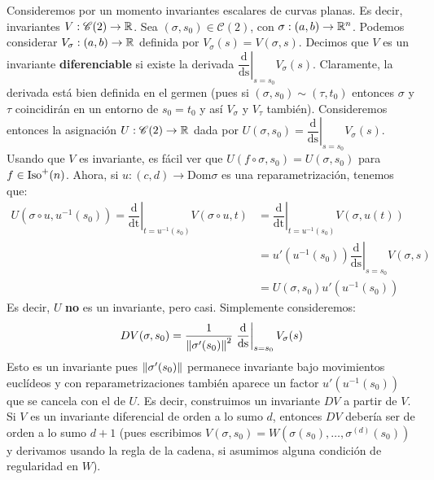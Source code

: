 Consideremos por un momento invariantes escalares de curvas planas. Es decir, invariantes $V:\mathscr{C}(2)\to\mathbb{R}$. Sea $(\sigma,s_0)\in\mathscr{C}(2)$, con $\sigma:(a,b)\to\mathbb{R}^n$. Podemos considerar $V_\sigma:(a,b)\to\mathbb{R}$ definida por $V_\sigma(s)=V(\sigma,s)$. Decimos que $V$ es un invariante \textbf{diferenciable} si existe la derivada $\left.\dfrac{\mathrm{d}}{\mathrm{ds}}\right\rvert_{s=s_0} V_\sigma(s)$. Claramente, la derivada está bien definida en el germen (pues si $(\sigma,s_0)\sim(\tau,t_0)$ entonces $\sigma$ y $\tau$ coincidirán en un entorno de $s_0=t_0$ y así $V_\sigma$ y $V_\tau$ también). Consideremos entonces la asignación $U:\mathscr{C}(2)\to\mathbb{R}$ dada por $U(\sigma,s_0)=\left.\dfrac{\mathrm{d}}{\mathrm{ds}}\right\rvert_{s=s_0} V_\sigma(s)$. Usando que $V$ es invariante, es fácil ver que $U(f\circ\sigma,s_0)=U(\sigma,s_0)$ para $f\in\operatorname{Iso}^+(n)$. Ahora, si $u:(c,d)\to\mathrm{Dom}\sigma$ es una reparametrización, tenemos que: \begin{align*}U(\sigma\circ u,u^{-1}(s_0)) = \left.\dfrac{\mathrm{d}}{\mathrm{dt}}\right\rvert_{t=u^{-1}(s_0)} V(\sigma\circ u,t)&=\left.\dfrac{\mathrm{d}}{\mathrm{dt}}\right\rvert_{t=u^{-1}(s_0)} V(\sigma,u(t))\\ &= u'(u^{-1}(s_0)) \left.\dfrac{\mathrm{d}}{\mathrm{ds}}\right\rvert_{s=s_0} V(\sigma,s)\\ &= U(\sigma,s_0)u'(u^{-1}(s_0))\end{align*} Es decir, $U$ \textbf{no} es un invariante, pero casi. Simplemente consideremos: $$DV(\sigma,s_0) = \dfrac{1}{\left\| \sigma'(s_0) \right\|^2}\left.\dfrac{\mathrm{d}}{\mathrm{ds}}\right\rvert_{s=s_0} V_\sigma(s)$$ Esto es un invariante pues $\left\| \sigma'(s_0) \right\|$ permanece invariante bajo movimientos euclídeos y con reparametrizaciones también aparece un factor $u'(u^{-1}(s_0))$ que se cancela con el de $U$. Es decir, construimos un invariante $DV$ a partir de $V$. Si $V$ es un invariante diferencial de orden a lo sumo $d$, entonces $DV$ debería ser de orden a lo sumo $d+1$ (pues escribimos $V(\sigma,s_0)=W(\sigma(s_0),\ldots,\sigma^{(d)}(s_0))$ y derivamos usando la regla de la cadena, si asumimos alguna condición de regularidad en $W$).

